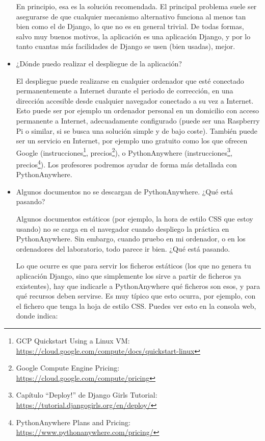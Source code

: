\begin{itemize}
  En principio, esa es la solución recomendada. El principal problema suele ser asegurarse de que cualquier mecanismo alternativo funciona al menos tan bien como el de Django, lo que no es en general trivial. De todas formas, salvo muy buenos motivos, la aplicación es una aplicación Django, y por lo tanto cuantas más facilidades de Django se usen (bien usadas), mejor.

\item ¿Dónde puedo realizar el despliegue de la aplicación?

  El despliegue puede realizarse en cualquier ordenador que esté conectado permanentemente a Internet durante el periodo de corrección, en una dirección accesible desde cualquier navegador conectado a su vez a Internet. Esto puede ser por ejemplo un ordenador personal en un domicilio con acceso permanente a Internet, adecuadamente configurado (puede ser una Raspberry Pi o similar, si se busca una solución simple y de bajo coste). También puede ser un servicio en Internet, por ejemplo uno gratuito como los que ofrecen Google (instrucciones\footnote{GCP Quickstart Using a Linux VM:\\ \url{https://cloud.google.com/compute/docs/quickstart-linux}}, precios\footnote{Google Compute Engine Pricing:\\ \url{https://cloud.google.com/compute/pricing}}), o PythonAnywhere (instrucciones\footnote{Capítulo ``Deploy!'' de Django Girls Tutorial:\\ \url{https://tutorial.djangogirls.org/en/deploy/}}, precios\footnote{PythonAnywhere Plans and Pricing:\\ \url{https://www.pythonanywhere.com/pricing/}}). Los profesores podremos ayudar de forma más detallada con PythonAnywhere.

\item Algunos documentos no se descargan de PythonAnywhere. ¿Qué está pasando?

  Algunos documentos estáticos (por ejemplo, la hora de estilo CSS que estoy usando) no se carga en el navegador cuando despliego la práctica en PythonAnywhere. Sin embargo, cuando pruebo en mi ordenador, o en los ordenadores del laboratorio, todo parece ir bien. ¿Qué está pasando.

  Lo que ocurre es que para servir los ficheros estáticos (los que no genera tu aplicación Django, sino que simplemente los sirve a partir de ficheros ya existentes), hay que indicarle a PythonAnywhere qué ficheros son esos, y para qué recursos deben servirse. Es muy típico que esto ocurra, por ejemplo, con el fichero que tenga la hoja de estilo CSS. Puedes ver esto en la consola web, donde indica:


\end{itemize}
